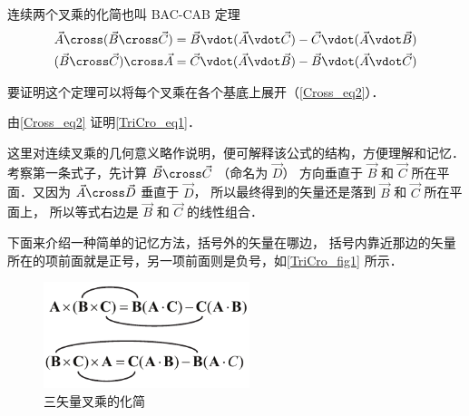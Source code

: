 

连续两个叉乘的化简也叫 BAC-CAB 定理
\begin{gather}
\vec A \cross (\vec B \cross \vec C) = \vec B \vdot (\vec A \vdot \vec C) - \vec C \vdot (\vec A \vdot \vec B)\label{TriCro_eq1}\\
(\vec B \cross \vec C) \cross \vec A = \vec C \vdot (\vec A \vdot \vec B) - \vec B \vdot (\vec A \vdot \vec C)
\end{gather}

要证明这个定理可以将每个叉乘在各个基底上展开（\autoref{Cross_eq2}）．

\begin{exer}{}
由\autoref{Cross_eq2} 证明\autoref{TriCro_eq1}．
\end{exer} 

这里对连续叉乘的几何意义略作说明，便可解释该公式的结构，方便理解和记忆．考察第一条式子，先计算 $\vec B \cross \vec C$ （命名为 $\vec D$） 方向垂直于 $\vec B$ 和 $\vec C$ 所在平面．又因为 $\vec A \cross \vec D$ 垂直于 $\vec D$， 所以最终得到的矢量还是落到 $\vec B$ 和 $\vec C$ 所在平面上， 所以等式右边是 $\vec B$ 和 $\vec C$ 的线性组合．

下面来介绍一种简单的记忆方法，括号外的矢量在哪边， 括号内靠近那边的矢量所在的项前面就是正号，另一项前面则是负号，如\autoref{TriCro_fig1} 所示．

\begin{figure}[ht]
\centering
\includegraphics[width=6cm]{./figures/TriCro1.pdf}
\caption{三矢量叉乘的化简}\label{TriCro_fig1}
\end{figure}